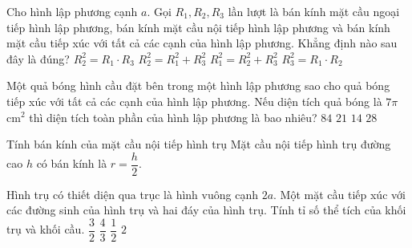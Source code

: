 \begin{vd}%
Cho hình lập phương cạnh $a$. Gọi $R_1, R_2, R_3$ lần lượt là bán kính mặt cầu ngoại tiếp hình lập phương, bán kính mặt cầu nội tiếp hình lập phương và bán kính mặt cầu tiếp xúc với tất cả các cạnh của hình lập phương. Khẳng định nào sau đây là đúng?
\choice
{$R_2^2=R_1\cdot R_3$}
{$R_2^2=R_1^2+R_3^2$}
{\True $R_1^2=R_2^2+R_3^2$}
{$R_3^2=R_1 \cdot R_2$}
\end{vd}

\begin{vd}%
Một quả bóng hình cầu đặt bên trong một hình lập phương sao cho quả bóng tiếp xúc với tất cả các cạnh của hình lập phương. Nếu diện tích quả bóng là $7\pi$ cm$^2$ thì diện tích toàn phần của hình lập phương là bao nhiêu?
\choice
{$84$}
{\True $21$}
{$14$}
{$28$}
\end{vd}

\begin{dang}{Tính bán kính của mặt cầu nội tiếp hình trụ}
Mặt cầu nội tiếp hình trụ đường cao $h$ có bán kính là $r=\dfrac{h}{2}$.
\end{dang}

\begin{vd}%
Hình trụ có thiết diện qua trục là hình vuông cạnh $2a$. Một mặt cầu tiếp xúc với các đường sinh của hình trụ và hai đáy của hình trụ. Tính tỉ số thể tích của khối trụ và khối cầu.
\choice
{\True $\dfrac{3}{2}$}
{$\dfrac{4}{3}$}
{$\dfrac{1}{2}$}
{$2$}
\end{vd}

